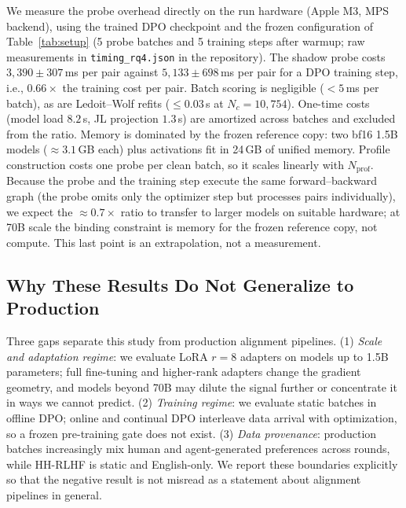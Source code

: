 \documentclass[runningheads]{llncs}
\begin{document}
We measure the probe overhead directly on the run hardware
(Apple M3, MPS backend), using the trained DPO checkpoint and the frozen
configuration of Table~\ref{tab:setup} (5 probe batches and 5 training steps
after warmup; raw measurements in \texttt{timing\_rq4.json} in the
repository). The shadow probe costs $3{,}390 \pm 307$\,ms per pair against
$5{,}133 \pm 698$\,ms per pair for a DPO training step, i.e., $0.66\times$ the
training cost per pair. Batch scoring is negligible ($<5$\,ms per batch), as
are Ledoit--Wolf refits ($\leq 0.03$\,s at $N_c = 10{,}754$). One-time costs
(model load $8.2$\,s, JL projection $1.3$\,s) are amortized across batches and
excluded from the ratio. Memory is dominated by the frozen reference copy: two
bf16 1.5B models ($\approx 3.1$\,GB each) plus activations fit in 24\,GB of
unified memory. Profile construction costs one probe per clean batch, so it
scales linearly with $N_{\text{prof}}$. Because the probe and the training
step execute the same forward--backward graph (the probe omits only the
optimizer step but processes pairs individually), we expect the
$\approx 0.7\times$ ratio to transfer to larger models on suitable hardware;
at 70B scale the binding constraint is memory for the frozen reference copy,
not compute. This last point is an extrapolation, not a measurement.

\subsection{Why These Results Do Not Generalize to Production}\label{sec:nogeneralize}

Three gaps separate this study from production alignment pipelines. (1)
\emph{Scale and adaptation regime}: we evaluate LoRA $r{=}8$ adapters on
models up to 1.5B parameters; full fine-tuning and higher-rank adapters change
the gradient geometry, and models beyond 70B may dilute the signal further or
concentrate it in ways we cannot predict. (2) \emph{Training regime}: we
evaluate static batches in offline DPO; online and continual DPO interleave
data arrival with optimization, so a frozen pre-training gate does not exist.
(3) \emph{Data provenance}: production batches increasingly mix human and
agent-generated preferences across rounds, while HH-RLHF is static and
English-only. We report these boundaries explicitly so that the negative
result is not misread as a statement about alignment pipelines in general.

\end{document}
